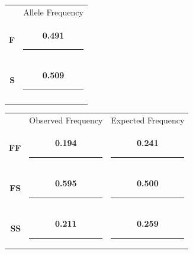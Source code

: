 \begin{minipage}{0.3\linewidth}
	\begin{tabular}{rc}
	&	Allele Frequency\\[3ex]
	\Large\textbf{F} & \ifprintanswers\textbf{0.491} \else \rule{3cm}{0.4pt} \fi\\[3ex]
	\Large\textbf{S} & \ifprintanswers\textbf{0.509} \else \rule{3cm}{0.4pt} \fi\\[3ex]
	\Large\null	 & \null\\
	\end{tabular}
\end{minipage}\hfill
\begin{minipage}{0.6\linewidth}
	\begin{tabular}{rcc}
		&	Observed Frequency		&	Expected Frequency\\[3ex]
		\large\textbf{FF} & \ifprintanswers\textbf{0.194} \else \rule{3cm}{0.4pt} \fi & \ifprintanswers\textbf{0.241} \else \rule{3cm}{0.4pt} \fi\\[3ex]
		\large\textbf{FS} & \ifprintanswers\textbf{0.595} \else \rule{3cm}{0.4pt} \fi & \ifprintanswers\textbf{0.500} \else \rule{3cm}{0.4pt} \fi \\[3ex]
		\large\textbf{SS} & \ifprintanswers\textbf{0.211} \else \rule{3cm}{0.4pt} \fi & \ifprintanswers\textbf{0.259} \else \rule{3cm}{0.4pt} \fi \\
	\end{tabular}
\end{minipage}
